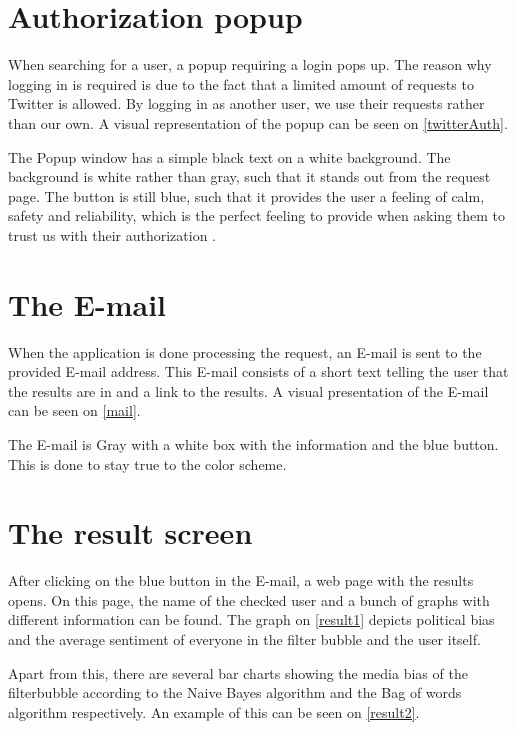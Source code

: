 \section{Authorization popup}

When searching for a user, a popup requiring a login pops up. The reason why
logging in is required is due to the fact that a limited amount of requests to
Twitter is allowed. By logging in as another user, we use their requests rather
than our own. A visual representation of the popup can be seen on
\autoref{twitterAuth}.


The Popup window has a simple black text on a white background. The background
is white rather than gray, such that it stands out from the request page. The
button is still blue, such that it provides the user a feeling of calm, safety
and reliability, which is the perfect feeling to provide when asking them to
trust us with their authorization \citep[p. 61]{WebUI}.

\section{The E-mail}
When the application is done processing the request, an E-mail is sent to the
provided E-mail address. This E-mail consists of a short text telling the user
that the results are in and a link to the results. A visual presentation of the
E-mail can be seen on \autoref{mail}.


The E-mail is Gray with a white box with the information and the blue button.
This is done to stay true to the color scheme. 

\section{The result screen}
After clicking on the blue button in the E-mail, a web page with the results
opens. On this page, the name of the checked user and a bunch of graphs with
different information can be found.
The graph on \autoref{result1} depicts political
bias and the average sentiment of everyone in the filter bubble and the user
itself. 


Apart from this, there are several bar charts showing the media bias of the
filterbubble according to the Naive Bayes algorithm and the Bag of words
algorithm respectively. An example of this can be seen on \autoref{result2}. 

